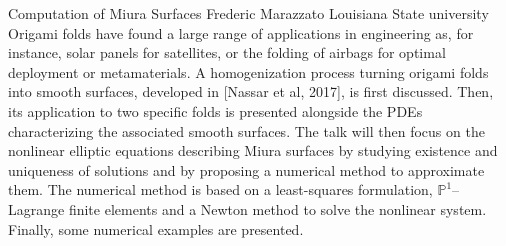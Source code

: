 \vspace{1.5ex}
\abs
{Computation of Miura Surfaces}
{Frederic Marazzato}
{Louisiana State university}
{Origami folds have found a large range of applications in engineering as, for instance, solar panels for satellites, or the folding of airbags for optimal deployment or metamaterials.
A homogenization process turning origami folds into smooth surfaces, developed in [Nassar et al, 2017], is first discussed.
Then, its application to two specific folds is presented alongside the PDEs characterizing the associated smooth surfaces.
The talk will then focus on the nonlinear elliptic equations describing Miura surfaces by studying existence and uniqueness of solutions and by proposing a numerical method to approximate them.
The numerical method is based on a least-squares formulation, $\mathbb{P}^1$--Lagrange finite elements and a Newton method to solve the nonlinear system.
Finally, some numerical examples are presented.}

